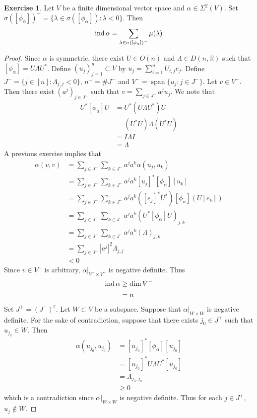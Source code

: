 \documentclass{book}
\theoremstyle{definition}
\newtheorem{ex}[definition]{Exercise}
\newcommand{\al}{\alpha}
\newcommand{\lam}{\lambda}
\newcommand{\sig}{\sigma}
\newcommand{\Lam}{\Lambda}
\newcommand{\Sig}{\Sigma}
\newcommand{\R}{\mathbb{R}}
\DeclareMathOperator{\spn}{span}
\DeclareMathOperator*{\ind}{\text{\text{ind}}}
\DeclareMathOperator*{\0}{\mbf{0}}
\DeclareMathOperator*{\1}{\mbf{1}}
\begin{document}
	\begin{ex}
		Let $V$ be a finite dimensional vector space and $\al \in \Sig^2(V)$. Set $\sig([\phi_{\al}])^- = \{\lam \in \sig([\phi_{\al}]): \lam < 0\}$. Then
		$$\ind \al = \sum_{ \lam \in \sig([\phi_{\al}])^-} \mu(\lam)$$
	\end{ex}

	\begin{proof}
		Since $\al$ is symmetric, there exist $U \in O(n)$ and $\Lam \in D(n, \R)$ such that $[\phi_{\al}] = U \Lam U^*$. Define $(u_j)_{j=1}^n \subset V$ by $u_j = \sum\limits_{i=1}^n U_{i,j} e_j$. Define $J^- = \{j \in [n]: \Lam_{j,j} < 0\}$, $n^- = \# J^-$ and $V^- = \spn \{u_j: j \in J^-\}$. Let $v \in V^-$. Then there exist $(a^j)_{j \in J^-}$ such that $v = \sum\limits_{j \in J^-} a^j u_j$. We note that 
		\begin{align*}
			U^* [\phi_{\al}] U 
			& = U^* (U \Lam U^*)U \\
			& = (U^*U) \Lam (U^*U) \\
			& = I \Lam I \\
			& = \Lam
		\end{align*} 
		A previous exercise implies that
		\begin{align*}
			\al(v, v)
			& = \sum_{j \in J^-} \sum_{k \in J^-} a^j a^k \al(u_j, u_k) \\
			& = \sum_{j \in J^-} \sum_{k \in J^-} a^j a^k [u_j]^*[\phi_{\al}] [u_k] \\
			& = \sum_{j \in J^-} \sum_{k \in J^-} a^j a^k ([e_j]^* U^*)[\phi_{\al}] (U [e_k] )\\
			& = \sum_{j \in J^-} \sum_{k \in J^-} a^j a^k (U^*[\phi_{\al}] U)_{j,k} \\
			& = \sum_{j \in J^-} \sum_{k \in J^-} a^j a^k (\Lam)_{j,k} \\
			& = \sum_{j \in J^-} |a^j|^2 \Lam_{j,j} \\
			& < 0
		\end{align*}
		Since $v \in V^-$ is arbitrary, $\al|_{V^- \times V^-}$ is negative definite. Thus 
		\begin{align*}
			\ind \al 
			& \geq \dim V^- \\
			& = n^-
		\end{align*}
		Set $J^+ = (J^-)^c$. Let $W \subset V$ be a subspace. Suppose that $\al|_{W \times W}$ is negative definite. For the sake of contradiction, suppose that there exists $j_0 \in J^+$ such that $u_{j_0} \in W$. Then
		\begin{align*}
			\al(u_{j_0}, u_{j_0})
			& = [u_{j_0}]^* [\phi_{\al}] [u_{j_0}] \\
			& = [u_{j_0}]^* U \Lam U^* [u_{j_0}] \\
			& = \Lam_{j_0, j_0} \\
			& \geq 0
		\end{align*}
		which is a contradiction since $\al|_{W \times W}$ is negative definite. Thus for each $j \in J^+$, $u_j \not \in W$.
	\end{proof}
\end{document}
